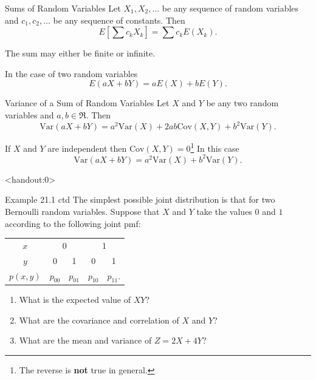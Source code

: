 \begin{frame}
  \begin{block}{Sums of Random Variables}
    Let $X_1,X_2,\ldots$ be any sequence of random variables and $c_1,c_2,\ldots$ be any sequence of constants. Then
    \[
      E\left[\sum c_kX_k\right]=\sum c_k E(X_k).
    \]
    
    \bigskip 
    
    The sum may either be finite or infinite.
    
    \bigskip
    
    In the case of two random variables
    \[
      E(aX + bY)=aE(X) + bE(Y). 
    \]
    
  \end{block}
\end{frame}

\begin{frame}
  \begin{block}{Variance of a Sum of Random Variables}
    Let $X$ and $Y$ be any two random variables and $a,b \in \Re$. Then
    \[
    \mbox{Var}(aX + bY)=a^2 \mbox{Var}(X) + 2ab\mbox{Cov}(X,Y) + b^2\mbox{Var}(Y). 
    \]
    
    \bigskip
    
    If $X$ and $Y$ are independent then $\mbox{Cov}(X,Y)=0$\footnote{The reverse is \textbf{not} true in general.} In this case
    \[
    \mbox{Var}(aX + bY)=a^2 \mbox{Var}(X) + b^2\mbox{Var}(Y).
    \]
  \end{block}
\end{frame}

\begin{frame}<handout:0>
  \begin{block}{Example 21.1 ctd}
    The simplest possible joint distribution is that for two Bernoulli random variables. Suppose that $X$ and $Y$ take the values $0$ and $1$ according to the following joint pmf:

    \begin{center}
      \begin{tabular}{c|cccc}
        $x$ & \multicolumn{2}{c}{0} & \multicolumn{2}{c}{1}\\
        $y$ & 0 & 1 & 0 & 1\\
        \hline
        $p(x,y)$ & $p_{00}$ & $p_{01}$ & $p_{10}$ & $p_{11}$.
      \end{tabular}
    \end{center}

    \begin{enumerate}
    \item What is the expected value of $XY$?
    \item What are the covariance and correlation of $X$ and $Y$?
    \item What are the mean and variance of $Z=2X + 4Y$?
    \end{enumerate}
  \end{block}
\end{frame}

